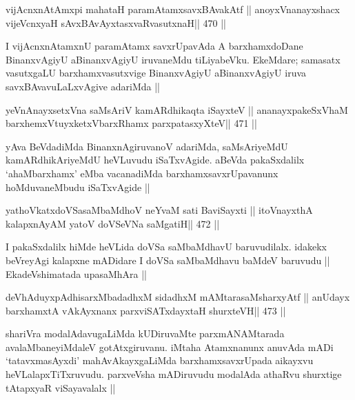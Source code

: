 
\begin{shl}
vijAcnxnAtAmx\s pi mahataH paramAtamxsavxBAvakAtf ||
anoyxV\s nanayxshacx vijeVcnxyaH sAvxBAvAyxtasxvaRvasutxnaH\hfill || 470 ||
\end{shl}

\begin{artha}
I vijAcnxnAtamxnU paramAtamx savxrUpavAda A barxhamxdoDane
BinanxvAgiyU aBinanxvAgiyU iruvaneMdu tiLiyabeVku. EkeMdare;
samasatx vasutxgaLU barxhamxvasutxvige BinanxvAgiyU aBinanxvAgiyU iruva
savxBAvavuLaLxvAgive adariMda ||
\end{artha}




\begin{shl}
yeVnAnayxsetxVna saMsAriV kamARdhikaqta iSayxteV ||
ananayxpakeSxV\s haM barxhemxVtuyxketxVbarxRhamx parxpatasxyXteV\hfill || 471 ||
\end{shl}

\begin{artha}
yAva BeVdadiMda BinanxnAgiruvanoV adariMda, saMsAriyeMdU
kamARdhikAriyeMdU heVLuvudu iSaTxvAgide. aBeVda pakaSxdalilx
`ahaMbarxhamx' eMba vacanadiMda barxhamxsavxrUpavanunx hoMduvaneMbudu
iSaTxvAgide ||
\end{artha}

\begin{shl}
yathoVkatxdoVSasaMbaMdhoV neYvaM sati BaviSayxti ||
itoV\s nayxthA kalapxnAyAM yatoV doVSeVNa saMgatiH\hfill || 472 ||
\end{shl}

\begin{artha}
I pakaSxdalilx hiMde heVLida doVSa saMbaMdhavU baruvudilalx. idakekx
beVreyAgi kalapxne mADidare I doVSa saMbaMdhavu baMdeV baruvudu ||
EkadeVshimatada upasaMhAra ||
\end{artha}



\begin{shl}
deVhAduyxpAdhisarxMbadadhxM sidadhxM mAMtarasaMsharxyAtf ||
anUdayx barxhamxtA vAkAyxnanx parxviSATxdayxtaH shurxteVH\hfill || 473 ||
\end{shl}

\begin{artha}
shariVra modalAdavugaLiMda kUDiruvaMte parxmANAMtarada 
avalaMbaneyiMdaleV
gotAtxgiruvanu. iMtaha Atamxnanunx anuvAda mADi `tatavxmasAyxdi'
mahAvAkayxgaLiMda barxhamxsavxrUpada aikayxvu heVLalapxTiTxruvudu.
parxveVsha mADiruvudu modalAda athaRvu shurxtige tAtapxyaR
viSayavalalx ||
\end{artha}


